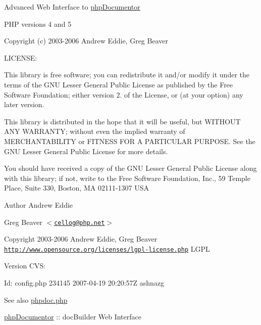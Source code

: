 \-Advanced \-Web \-Interface to \hyperlink{namespacephp_documentor}{php\-Documentor}

\-P\-H\-P versions 4 and 5

\-Copyright (c) 2003-\/2006 \-Andrew \-Eddie, \-Greg \-Beaver

\-L\-I\-C\-E\-N\-S\-E\-:

\-This library is free software; you can redistribute it and/or modify it under the terms of the \-G\-N\-U \-Lesser \-General \-Public \-License as published by the \-Free \-Software \-Foundation; either version 2. of the \-License, or (at your option) any later version.

\-This library is distributed in the hope that it will be useful, but \-W\-I\-T\-H\-O\-U\-T \-A\-N\-Y \-W\-A\-R\-R\-A\-N\-T\-Y; without even the implied warranty of \-M\-E\-R\-C\-H\-A\-N\-T\-A\-B\-I\-L\-I\-T\-Y or \-F\-I\-T\-N\-E\-S\-S \-F\-O\-R \-A \-P\-A\-R\-T\-I\-C\-U\-L\-A\-R \-P\-U\-R\-P\-O\-S\-E. \-See the \-G\-N\-U \-Lesser \-General \-Public \-License for more details.

\-You should have received a copy of the \-G\-N\-U \-Lesser \-General \-Public \-License along with this library; if not, write to the \-Free \-Software \-Foundation, \-Inc., 59 \-Temple \-Place, \-Suite 330, \-Boston, \-M\-A 02111-\/1307 \-U\-S\-A

\begin{DoxyAuthor}{\-Author}
\-Andrew \-Eddie 

\-Greg \-Beaver $<$\href{mailto:cellog@php.net}{\tt cellog@php.\-net}$>$ 
\end{DoxyAuthor}
\begin{DoxyCopyright}{\-Copyright}
2003-\/2006 \-Andrew \-Eddie, \-Greg \-Beaver  \href{http://www.opensource.org/licenses/lgpl-license.php}{\tt http\-://www.\-opensource.\-org/licenses/lgpl-\/license.\-php} \-L\-G\-P\-L 
\end{DoxyCopyright}
\begin{DoxyVersion}{\-Version}
\-C\-V\-S\-: 
\end{DoxyVersion}
\begin{DoxyParagraph}{\-Id\-:}
config.\-php 234145 2007-\/04-\/19 20\-:20\-:57\-Z ashnazg 
\end{DoxyParagraph}
\begin{DoxySeeAlso}{\-See also}
\hyperlink{phpdoc_8php}{phpdoc.\-php}
\end{DoxySeeAlso}
\hyperlink{namespacephp_documentor}{php\-Documentor} \-:\-: doc\-Builder \-Web \-Interface

